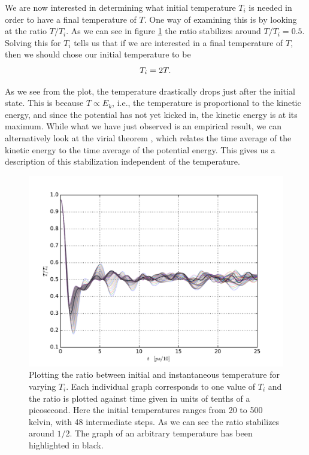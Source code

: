 \documentclass[a4paper]{article}
\begin{document}
    We are now interested in determining what initial temperature $T_i$ is needed
    in order to have a final temperature of $T$.  One way of examining this is by
    looking at the ratio $T/T_i$. As we can see in figure \ref{fig:temperature_ratio} the
    ratio stabilizes around $T/T_i = 0.5$. Solving this for $T_i$ tells us that if
    we are interested in a final temperature of $T$, then we should chose our
    initial temperature to be
    \begin{equation}
        \notag
        T_i = 2T.
    \end{equation}

    As we see from the plot, the temperature drastically drops just after the
    initial state. This is because $T \propto E_k$, i.e., the temperature is
    proportional to the kinetic energy, and since the potential has not yet kicked
    in, the kinetic energy is at its maximum. While what we have just observed is
    an empirical result, we can alternatively look at the virial theorem
    \cite{virial}, which relates the time average of the kinetic energy to the time
    average of the potential energy. This gives us a description of this
    stabilization independent of the temperature. 

    \begin{figure}[h]
        \centering \includegraphics[width=0.8\linewidth]{temperature_ratio.pdf}
        \caption[Temperature ratio]{Plotting the ratio between initial and
            instantaneous temperature for varying $T_i$. Each individual graph
            corresponds to one value of $T_i$ and the ratio is plotted against
            time given in units of tenths of a picosecond. Here the initial
            temperatures ranges from 20 to 500 kelvin, with 48 intermediate
            steps.  As we can see the ratio stabilizes around $1/2$. The graph of
            an arbitrary temperature has been highlighted in black.}
        \label{fig:temperature_ratio}
    \end{figure}
\end{document}
